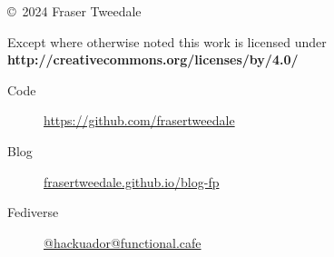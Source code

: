 \documentclass[ignorenonframetext,aspectratio=169,12pt]{beamer}
\begin{document}
\begin{frame}[plain]
\begin{columns}

  \begin{column}{.6\textwidth}

    \setlength{\parskip}{.5em}

    { \centering

    

    \copyright~2024  Fraser Tweedale

    { \scriptsize
    Except where otherwise noted this work is licensed under
    }
    { \footnotesize
    \textbf{http://creativecommons.org/licenses/by/4.0/}
    }

    }

    \begin{description}
      \item[Code] \url{https://github.com/frasertweedale}
      \item[Blog] \href{https://frasertweedale.github.io/blog-fp/}{frasertweedale.github.io/blog-fp}
      \item[Fediverse] \href{https://functional.cafe/@hackuador}{@hackuador@functional.cafe}
    \end{description}
  \end{column}

\end{columns}
\end{frame}
\end{document}
